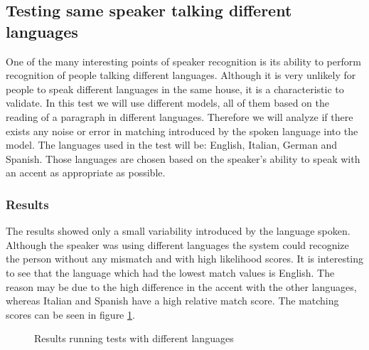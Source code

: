 \subsection{Testing same speaker talking different languages}

One of the many interesting points of speaker recognition is its ability to perform
recognition of people talking different languages. Although it is very unlikely
for people to speak different languages in the same house, it is a characteristic to
validate. In this test we will use different models, all of them based on the reading of a
paragraph in different languages. Therefore we will analyze if there exists any noise or error
in matching introduced by the spoken language into the model. The languages used in the test will be:
English, Italian, German and Spanish. Those languages are chosen based on the speaker's ability to
speak with an accent as appropriate as possible.



\subsubsection{Results}

The results showed only a small variability introduced by the language spoken. Although
the speaker was using different languages the system could recognize the person without
any mismatch and with high likelihood scores. It is interesting to see that the language
which had the lowest match values is English. The reason may be due to the high difference
in the accent with the other languages, whereas Italian and Spanish have a high relative
match score. The matching scores can be seen in figure \ref{chart:score-lang}.
\begin{figure}
\begin{center}
\caption{Results running tests with different languages}
\label{chart:score-lang}
\end{center}
\end{figure}


